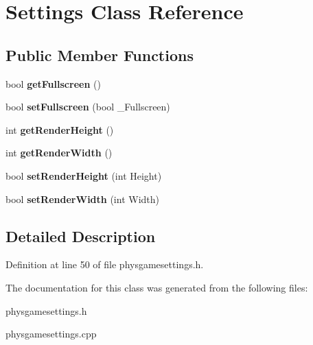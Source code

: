 \hypertarget{classSettings}{
\section{Settings Class Reference}
\label{df/d9a/classSettings}
}
\subsection*{Public Member Functions}
\begin{DoxyCompactItemize}
\item 
\hypertarget{classSettings_a9c2f80cb87b5b3e8f2da0b6056c2cad6}{
bool {\bfseries getFullscreen} ()}
\label{df/d9a/classSettings_a9c2f80cb87b5b3e8f2da0b6056c2cad6}

\item 
\hypertarget{classSettings_a7227367aa824b71d1366eddce9a94e3f}{
bool {\bfseries setFullscreen} (bool \_\-Fullscreen)}
\label{df/d9a/classSettings_a7227367aa824b71d1366eddce9a94e3f}

\item 
\hypertarget{classSettings_a0d620300e6eb872e6914cabad3035641}{
int {\bfseries getRenderHeight} ()}
\label{df/d9a/classSettings_a0d620300e6eb872e6914cabad3035641}

\item 
\hypertarget{classSettings_aea6ac481630cf986acf3853939c6bdf3}{
int {\bfseries getRenderWidth} ()}
\label{df/d9a/classSettings_aea6ac481630cf986acf3853939c6bdf3}

\item 
\hypertarget{classSettings_a0381303bcccf944c77b8f88dcb4ffa96}{
bool {\bfseries setRenderHeight} (int Height)}
\label{df/d9a/classSettings_a0381303bcccf944c77b8f88dcb4ffa96}

\item 
\hypertarget{classSettings_abb497fd25c4184054c1bb89a7e58b5d3}{
bool {\bfseries setRenderWidth} (int Width)}
\label{df/d9a/classSettings_abb497fd25c4184054c1bb89a7e58b5d3}

\end{DoxyCompactItemize}


\subsection{Detailed Description}


Definition at line 50 of file physgamesettings.h.

The documentation for this class was generated from the following files:\begin{DoxyCompactItemize}
\item 
physgamesettings.h\item 
physgamesettings.cpp\end{DoxyCompactItemize}
